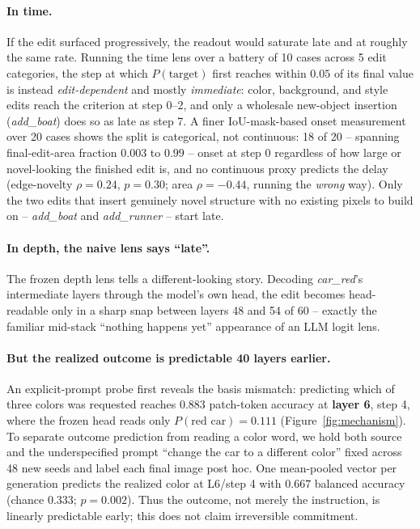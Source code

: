 \paragraph{In time.} If the edit surfaced progressively, the readout would
saturate late and at roughly the same rate. Running the time lens over a battery of
10 cases across 5 edit categories, the step at which $P(\text{target})$
first reaches within $0.05$ of its final value is instead
\emph{edit-dependent} and mostly \emph{immediate}: color, background, and
style edits reach the criterion at step 0--2, and only a wholesale
new-object insertion (\emph{add\_boat}) does so as late as step 7. A finer
IoU-mask-based onset measurement over 20 cases shows the split is
categorical, not continuous: 18 of 20 -- spanning final-edit-area
fraction $0.003$ to $0.99$ -- onset at step 0 regardless of how large or
novel-looking the finished edit is, and no continuous proxy predicts the
delay (edge-novelty $\rho{=}0.24$, $p{=}0.30$; area $\rho{=}{-}0.44$,
running the \emph{wrong} way). Only the two edits that insert genuinely
novel structure with no existing pixels to build on -- \emph{add\_boat}
and \emph{add\_runner} -- start late.

\paragraph{In depth, the naive lens says ``late''.} The frozen depth lens
tells a different-looking story. Decoding \emph{car\_red}'s intermediate
layers through the model's own head, the edit becomes head-readable only
in a sharp snap between layers 48 and 54 of 60 -- exactly the familiar
mid-stack ``nothing happens yet'' appearance of an LLM logit lens.

\paragraph{But the realized outcome is predictable 40 layers earlier.}
An explicit-prompt probe first reveals the basis mismatch: predicting
which of three colors was requested reaches $0.883$ patch-token accuracy at
\textbf{layer 6}, step 4, where the frozen head reads only
$P(\text{red car}){=}0.111$ (Figure~\ref{fig:mechanism}). To separate
outcome prediction from reading a color word, we hold both source and
the underspecified prompt ``change the car to a different color'' fixed
across 48 new seeds and label each final image post hoc. One mean-pooled
vector per generation predicts the realized color at L6/step 4 with
$0.667$ balanced accuracy (chance $0.333$; $p{=}0.002$). Thus the outcome,
not merely the instruction, is linearly predictable early; this does not
claim irreversible commitment.

